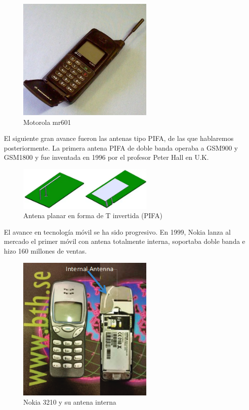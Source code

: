 \documentclass[a4paper,11pt,titlepage]{article}
\begin{document}
\begin{figure}[H]
\centering
\includegraphics[width=0.6\textwidth]{motorolamr601}
\caption{Motorola mr601}
\label{motorolamr601}
\end{figure}
\par
El siguiente gran avance fueron las antenas tipo PIFA, de las que hablaremos posteriormente. La primera antena PIFA de doble banda operaba a GSM900 y GSM1800 y fue inventada en 1996 por el profesor Peter Hall en U.K.
\par
\begin{figure}[H]
\centering
\includegraphics[width=0.6\textwidth]{pifa1}
\caption{Antena planar en forma de T invertida (PIFA)}
\label{pifa1}
\end{figure}
El avance en tecnología móvil se ha sido progresivo. En 1999, Nokia lanza al mercado el primer móvil con antena totalmente interna, soportaba doble banda e hizo 160 millones de ventas.
\begin{figure}[H]
\centering
\includegraphics[width=0.6\textwidth]{nokia3210}
\caption{Nokia 3210 y su antena interna}
\label{nokia3210}
\end{figure}
\end{document}
